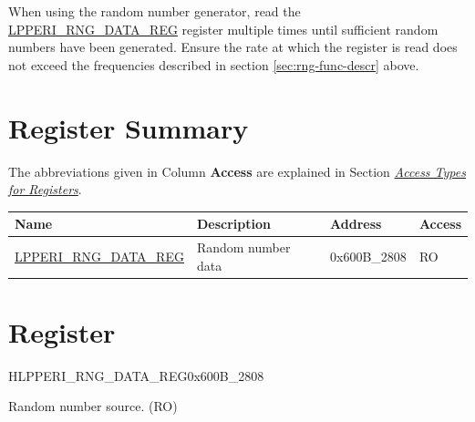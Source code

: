 \documentclass[main\_\_EN.tex]{subfiles}
\begin{document}
When using the random number generator, read the \hyperref[regdesc:LPPERIRNGDATAREG]{LPPERI\_RNG\_DATA\_REG} register multiple times until sufficient random numbers have been generated. Ensure the rate at which the register is read does not exceed the frequencies described in section \ref{sec:rng-func-descr} above.



\hypertarget{rng-reg-summ}{}
\section{Register Summary}

The abbreviations given in Column \textbf{Access} are explained in Section \hyperref[glossary-access-types]{\textit{Access Types for Registers}}.

\begin{table}[H]
    \centering
    \setlength{\extrarowheight}{0.3em}
        \begin{tabular}{ | l | l | l | l | }
    \hline
    \rowcolor{lightgray}
    \textbf{Name} & \textbf{Description} & \textbf{Address} & \textbf{Access} \\ \hline
    \hyperref[regdesc:LPPERIRNGDATAREG]{LPPERI\_RNG\_DATA\_REG} & Random number data & 0x600B\_2808 & RO \\ \hline
    \end{tabular}
\end{table}

\section{Register}

\begin{register}{H}{LPPERI\_RNG\_DATA\_REG}{0x600B\_2808}\label{regdesc:LPPERIRNGDATAREG}
%
\regnewline%
\begin{regdesc}\begin{reglist}
\label{fielddesc:LPPERIRNGDATA}\item [LPPERI\_RNG\_DATA] Random number source. (RO)
\end{reglist}\end{regdesc}
\end{register}
\end{document}
